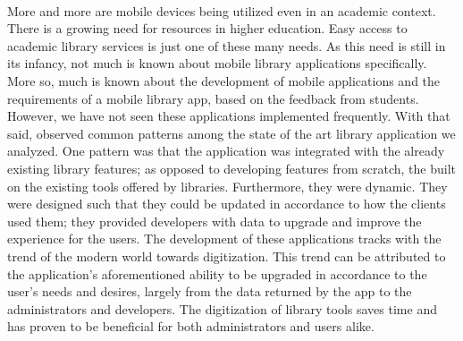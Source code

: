    \paragraph{}
    More and more are mobile devices being utilized even in an academic context. There is a growing need for resources in higher education. Easy access to academic library services is just one of these many needs. As this need is still in its infancy, not much is known about mobile library applications specifically. More so, much is known about the development of mobile applications and the requirements of a mobile library app, based on the feedback from students. However, we have not seen these applications implemented frequently. With that said, observed common patterns among the state of the art library application we analyzed. One pattern was that the application was integrated with the already existing library features; as opposed to developing features from scratch, the built on the existing tools offered by libraries. Furthermore, they were dynamic. They were designed such that they could be updated in accordance to how the clients used them; they provided developers with data to upgrade and improve the experience for the users. The development of these applications tracks with the trend of the modern world towards digitization. This trend can be attributed to the application's aforementioned  ability to be  upgraded in accordance to the user's needs and desires, largely from the data returned by the app to the administrators and developers. The digitization of library tools saves time and has proven to be beneficial for both administrators and users alike.